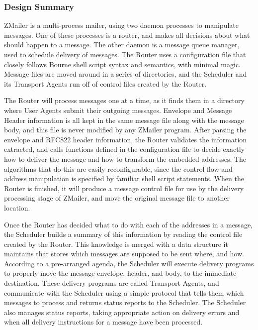 \subsubsection{Design Summary}

ZMailer is a multi-process mailer, using two daemon processes to manipulate
messages.  One of these processes is a router, and makes all decisions
about what should happen to a message.  The other daemon is a message queue
manager, used to schedule delivery of messages.  The Router uses a
configuration file that closely follows Bourne shell script syntax and
semantics, with minimal magic.  Message files are moved around in a series
of directories, and the Scheduler and its Transport Agents run off of
control files created by the Router.

The Router will process messages one at a time, as it finds them in a
directory where User Agents submit their outgoing messages.  Envelope and
Message Header information is all kept in the same message file along with
the message body, and this file is never modified by any ZMailer program.
After parsing the envelope and RFC822 header information, the Router
validates the information extracted, and calls functions defined in the
configuration file to decide exactly how to deliver the message and how to
transform the embedded addresses.  The algorithms that do this are easily
reconfigurable, since the control flow and address manipulation is
specified by familiar shell script statements.  When the Router is
finished, it will produce a message control file for use by the delivery
processing stage of ZMailer, and move the original message file to another
location.

Once the Router has decided what to do with each of the addresses in a
message, the Scheduler builds a summary of this information by reading the
control file created by the Router.  This knowledge is merged with a data
structure it maintains that stores which messages are supposed to be sent
where, and how.  According to a pre-arranged agenda, the Scheduler will
execute delivery programs to properly move the message envelope, header,
and body, to the immediate destination.  These delivery programs are called
Transport Agents, and communicate with the Scheduler using a simple
protocol that tells them which messages to process and returns status
reports to the Scheduler.  The Scheduler also manages status reports,
taking appropriate action on delivery errors and when all delivery
instructions for a message have been processed.

